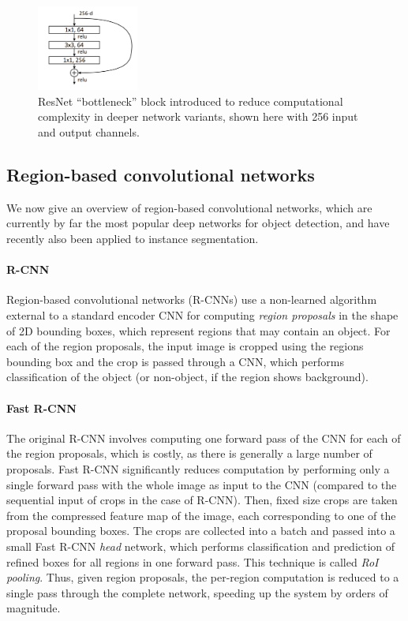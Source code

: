 \begin{figure}[t]
  \centering
  \includegraphics[width=0.3\textwidth]{figures/bottleneck}
\caption{
ResNet \cite{ResNet} \enquote{bottleneck} block introduced to reduce computational
complexity in deeper network variants, shown here with 256 input and output channels.
}
\label{figure:bottleneck}
\end{figure}

\subsection{Region-based convolutional networks}
\label{ssec:rcnn}
We now give an overview of region-based convolutional networks, which are currently by far the
most popular deep networks for object detection, and have recently also been applied to instance segmentation.

\paragraph{R-CNN}
Region-based convolutional networks (R-CNNs) \cite{RCNN} use a non-learned algorithm external to a standard encoder CNN
for computing \emph{region proposals} in the shape of 2D bounding boxes, which represent regions that may contain an object.
For each of the region proposals, the input image is cropped using the regions bounding box and the crop is
passed through a CNN, which performs classification of the object (or non-object, if the region shows background).

\paragraph{Fast R-CNN}
The original R-CNN involves computing one forward pass of the CNN for each of the region proposals,
which is costly, as there is generally a large number of proposals.
Fast R-CNN \cite{FastRCNN} significantly reduces computation by performing only a single forward pass with the whole image
as input to the CNN (compared to the sequential input of crops in the case of R-CNN).
Then, fixed size crops are taken from the compressed feature map of the image,
each corresponding to one of the proposal bounding boxes.
The crops are collected into a batch and passed into a small Fast R-CNN
\emph{head} network, which performs classification and prediction of refined boxes for all regions in one forward pass.
This technique is called \emph{RoI pooling}. %
Thus, given region proposals, the per-region computation is reduced to a single pass through the complete network,
speeding up the system by orders of magnitude. %

